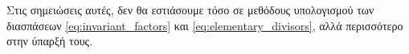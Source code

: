 \documentclass[12pt,a4paper,reqno]{amsart}
\theoremstyle{definition}
\theoremstyle{remark}
\numberwithin{theorem}{section}
\numberwithin{exercise}{section}
\numberwithin{equation}{section}
\begin{document}
Στις σημειώσεις αυτές, δεν θα εστιάσουμε τόσο σε μεθόδους υπολογισμού των διασπάσεων \eqref{eq:invariant_factors} και \eqref{eq:elementary_divisors}, αλλά περισσότερο στην ύπαρξή τους. 


\end{document}
